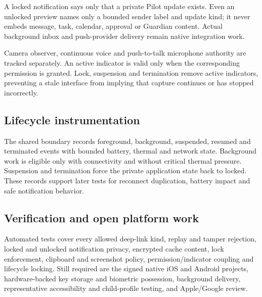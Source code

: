 A locked notification says only that a private Pilot update exists.  Even an
unlocked preview names only a bounded sender label and update kind; it never embeds
message, task, calendar, approval or Guardian content.  Actual background inbox and
push-provider delivery remain native integration work.

Camera observer, continuous voice and push-to-talk microphone authority are tracked
separately.  An active indicator is valid only when the corresponding permission is
granted.  Lock, suspension and termination remove active indicators, preventing a
stale interface from implying that capture continues or has stopped incorrectly.

\subsection{Lifecycle instrumentation}

The shared boundary records foreground, background, suspended, resumed and
terminated events with bounded battery, thermal and network state.  Background work
is eligible only with connectivity and without critical thermal pressure.
Suspension and termination force the private application state back to locked.
These records support later tests for reconnect duplication, battery impact and
safe notification behavior.

\subsection{Verification and open platform work}

Automated tests cover every allowed deep-link kind, replay and tamper rejection,
locked and unlocked notification privacy, encrypted cache content, lock enforcement,
clipboard and screenshot policy, permission/indicator coupling and lifecycle
locking.  Still required are the signed native iOS and Android projects,
hardware-backed key storage and biometric possession, background delivery,
representative accessibility and child-profile testing, and Apple/Google review.
